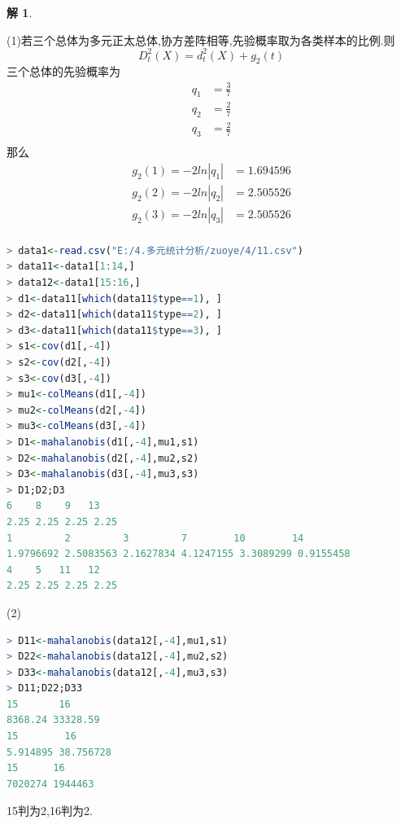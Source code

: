 \documentclass[11pt,a4paper]{ctexart}
\newtheorem*{solution}{解}
\begin{document}
\begin{solution}
\end{solution}
(1)若三个总体为多元正太总体,协方差阵相等,先验概率取为各类样本的比例.则
$$D^2_t(X)=d^2_t(X)+g_2(t)$$
三个总体的先验概率为
\begin{equation}
	\begin{aligned}
		q_1&=\frac{3}{7}\\
		q_2&=\frac{2}{7}\\
		q_3&=\frac{2}{7}\\
	\end{aligned}
\end{equation}
那么
\begin{equation}
	\begin{aligned}
		g_2(1)=-2ln|q_1|&=1.694596\\
		g_2(2)=-2ln|q_2|&=2.505526\\
		g_2(3)=-2ln|q_3|&=2.505526\\
	\end{aligned}
\end{equation}
\begin{lstlisting}[language=r]
> data1<-read.csv("E:/4.多元统计分析/zuoye/4/11.csv")
> data11<-data1[1:14,]
> data12<-data1[15:16,]
> d1<-data11[which(data11$type==1), ]
> d2<-data11[which(data11$type==2), ]
> d3<-data11[which(data11$type==3), ]
> s1<-cov(d1[,-4])
> s2<-cov(d2[,-4])
> s3<-cov(d3[,-4])
> mu1<-colMeans(d1[,-4])
> mu2<-colMeans(d2[,-4])
> mu3<-colMeans(d3[,-4])
> D1<-mahalanobis(d1[,-4],mu1,s1)
> D2<-mahalanobis(d2[,-4],mu2,s2)
> D3<-mahalanobis(d3[,-4],mu3,s3)
> D1;D2;D3
6    8    9   13 
2.25 2.25 2.25 2.25 
1         2         3         7        10        14 
1.9796692 2.5083563 2.1627834 4.1247155 3.3089299 0.9155458 
4    5   11   12 
2.25 2.25 2.25 2.25 

\end{lstlisting}


(2)
\begin{lstlisting}[language=r]
> D11<-mahalanobis(data12[,-4],mu1,s1)
> D22<-mahalanobis(data12[,-4],mu2,s2)
> D33<-mahalanobis(data12[,-4],mu3,s3)
> D11;D22;D33
15       16 
8368.24 33328.59 
15        16 
5.914895 38.756728 
15      16 
7020274 1944463 
\end{lstlisting}
15判为2,16判为2.
\end{document}
